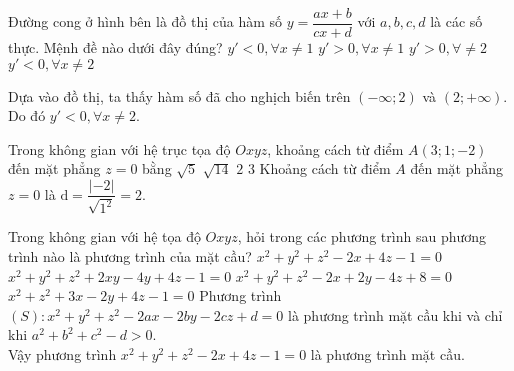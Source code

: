 \begin{ex}%
\immini
{
Đường cong ở hình bên là đồ thị của hàm số $y=\dfrac{a x+b}{c x+d}$ với $a,b,c,d$ là các số thực. Mệnh đề nào dưới đây đúng?
\choice
{$y'<0,\forall x\ne 1$}
{$y'>0,\forall x\ne 1$}
{$y'>0,\forall\ne 2$}
{\True $y'<0,\forall x\ne 2$}
}
{
}
\loigiai
{
Dựa vào đồ thị, ta thấy hàm số đã cho nghịch biến trên $(-\infty;2)$ và $(2;+\infty)$. Do đó $y'<0,\forall x\ne2$.
}
\end{ex}
\begin{ex}%
Trong không gian với hệ trục tọa độ $O x y z$, khoảng cách từ điểm $A(3;1;-2)$ đến mặt phẳng $z=0$ bằng
\choice
{$\sqrt{5}$}
{$\sqrt{14}$}
{\True $2$}
{$3$}
\loigiai
{
Khoảng cách từ điểm $A$ đến mặt phẳng $z=0$ là $\mathrm{d}=\dfrac{|-2|}{\sqrt{1^2}}=2$.
}
\end{ex}

\begin{ex}%
Trong không gian với hệ tọa độ $O x y z$, hỏi trong các phương trình sau phương trình nào là phương trình của mặt cầu?
\choice
{\True $x^2+y^2+z^2-2x+4z-1=0$}
{$x^2+y^2+z^2+2x y-4y+4z-1=0$}
{$x^2+y^2+z^2-2x+2y-4z+8=0$}
{$x^2+z^2+3x-2y+4z-1=0$}
\loigiai
{
Phương trình $(S):x^2+y^2+z^2-2ax-2by-2cz+d=0$ là phương trình mặt cầu khi và chỉ khi $a^2+b^2+c^2-d>0$.\\
Vậy phương trình $x^2+y^2+z^2-2x+4z-1=0$ là phương trình mặt cầu.
}
\end{ex}

